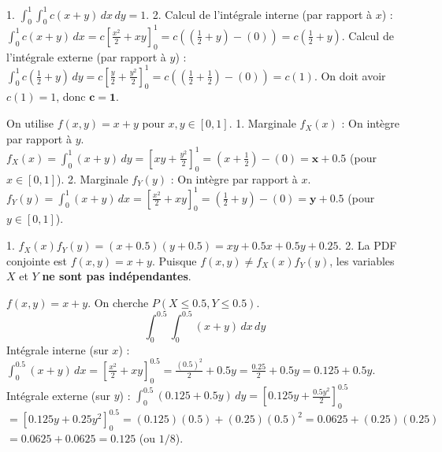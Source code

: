 
\begin{correctionbox}
1.  $\int_{0}^1 \int_{0}^1 c(x+y) \, dx \, dy = 1$.
2.  Calcul de l'intégrale interne (par rapport à $x$) :
    $\int_0^1 c(x+y) \, dx = c \left[ \frac{x^2}{2} + xy \right]_0^1 = c \left( (\frac{1}{2} + y) - (0) \right) = c(\frac{1}{2} + y)$.
    Calcul de l'intégrale externe (par rapport à $y$) :
    $\int_0^1 c(\frac{1}{2} + y) \, dy = c \left[ \frac{y}{2} + \frac{y^2}{2} \right]_0^1 = c \left( (\frac{1}{2} + \frac{1}{2}) - (0) \right) = c(1)$.
    On doit avoir $c(1) = 1$, donc $\mathbf{c=1}$.
\end{correctionbox}

\begin{correctionbox}
On utilise $f(x,y) = x+y$ pour $x,y \in [0,1]$.
1.  Marginale $f_X(x)$ : On intègre par rapport à $y$.
    $f_X(x) = \int_0^1 (x+y) \, dy = \left[ xy + \frac{y^2}{2} \right]_0^1 = (x + \frac{1}{2}) - (0) = \mathbf{x + 0.5}$ (pour $x \in [0,1]$).
2.  Marginale $f_Y(y)$ : On intègre par rapport à $x$.
    $f_Y(y) = \int_0^1 (x+y) \, dx = \left[ \frac{x^2}{2} + xy \right]_0^1 = (\frac{1}{2} + y) - (0) = \mathbf{y + 0.5}$ (pour $y \in [0,1]$).
\end{correctionbox}

\begin{correctionbox}
1.  $f_X(x) f_Y(y) = (x + 0.5)(y + 0.5) = xy + 0.5x + 0.5y + 0.25$.
2.  La PDF conjointe est $f(x,y) = x+y$.
    Puisque $f(x,y) \neq f_X(x) f_Y(y)$, les variables $X$ et $Y$ \textbf{ne sont pas indépendantes}.
\end{correctionbox}

\begin{correctionbox}
$f(x,y) = x+y$. On cherche $P(X \le 0.5, Y \le 0.5)$.
$$ \int_0^{0.5} \int_0^{0.5} (x+y) \, dx \, dy $$
Intégrale interne (sur $x$) : $\int_0^{0.5} (x+y) \, dx = \left[ \frac{x^2}{2} + xy \right]_0^{0.5} = \frac{(0.5)^2}{2} + 0.5y = \frac{0.25}{2} + 0.5y = 0.125 + 0.5y$.
Intégrale externe (sur $y$) : $\int_0^{0.5} (0.125 + 0.5y) \, dy = \left[ 0.125y + \frac{0.5y^2}{2} \right]_0^{0.5}$
$= [ 0.125y + 0.25y^2 ]_0^{0.5} = (0.125)(0.5) + (0.25)(0.5)^2 = 0.0625 + (0.25)(0.25)$
$= 0.0625 + 0.0625 = \mathbf{0.125}$ (ou $1/8$).
\end{correctionbox}

